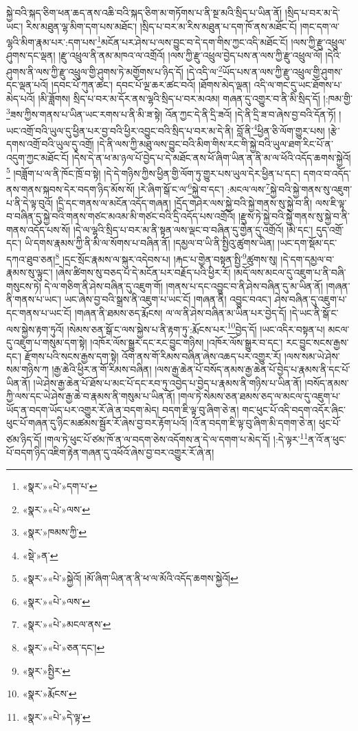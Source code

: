 སྐྱེ་བའི་སྐད་ཅིག་ཕན་ཆད་ནས་འཆི་བའི་སྐད་ཅིག་མ་གཏོགས་པ་ནི་སྔ་མའི་སྲིད་པ་ཡིན་ནོ། །སྲིད་པ་བར་མ་དེ་ཡང་། རིས་མཐུན་ལྷ་མིག་དག་པས་མཐོང་། །སྲིད་པ་བར་མ་རིས་མཐུན་པ་དག་ཁོ་ནས་མཐོང་ངོ། །གང་དག་ལ་ལྷའི་མིག་རྣམ་པར་:དག་པས་\footnote{«སྣར་»«པེ་»དག་པ་}མངོན་པར་ཤེས་པ་ལས་བྱུང་བ་དེ་དག་གིས་ཀྱང་འདི་མཐོང་ངོ། །ལས་ཀྱི་རྫུ་འཕྲུལ་ཤུགས་དང་ལྡན། །རྫུ་འཕྲུལ་ནི་ནམ་མཁའ་ལ་འགྲོའོ། །ལས་ཀྱི་རྫུ་འཕྲུལ་བྱེད་པས་ན་ལས་ཀྱི་རྫུ་འཕྲུལ་ལོ། །དེའི་ཤུགས་ནི་ལས་ཀྱི་རྫུ་འཕྲུལ་གྱི་ཤུགས་ཏེ་མགྱོགས་པ་ཉིད་དོ། །དེ་འདི་ལ་\footnote{«སྣར་»«པེ་»ལས་}ཡོད་པས་ན་ལས་ཀྱི་རྫུ་འཕྲུལ་གྱི་ཤུགས་དང་ལྡན་པའོ། །དབང་པོ་ཀུན་ཚང་། དབང་པོ་ལྔ་ཆར་ཚང་བའོ། །ཐོགས་མེད་ལྡན། འདི་ལ་གང་དུ་ཡང་ཐོགས་པ་མེད་པའོ། །མི་ཟློགས། སྲིད་པ་བར་མ་དོར་ནས་ལྷའི་སྲིད་པ་བར་མའམ། གཞན་དུ་འགྱུར་བ་ནི་མི་སྲིད་དོ། །:ཁམ་གྱི་\footnote{«སྣར་»ཁམས་ཀྱི་}ཟས་ཀྱིས་གནས་པ་ཡིན་ཡང་རགས་པ་ནི་མི་ཟ་སྟེ། འོན་ཀྱང་དེ་ནི་དྲི་ཟའོ། །དེ་ནི་དྲི་ཟ་བ་ཞེས་བྱ་བའི་དོན་ཏོ། །ཡང་འགྲོ་བའི་ཡུལ་དུ་ཕྱིན་པར་བྱ་བའི་ཕྱིར་འབྱུང་བའི་སྲིད་པ་བར་མ་དེ་ནི། བློ་ནི་\footnote{«སྡེ་»ན་}ཕྱིན་ཅི་ལོག་གྱུར་པས། །རྩེ་དགས་འགྲོ་བའི་ཡུལ་དུ་འགྲོ། །དེ་ནི་ལས་ཀྱི་མཐུ་ལས་བྱུང་བའི་མིག་གིས་རང་གི་སྐྱེ་བའི་ཡུལ་ཐག་རིང་པོ་ན་འདུག་ཀྱང་མཐོང་ངོ། །དེས་དེ་ན་ཕ་མ་ཉལ་པོ་བྱེད་པ་དེ་མཐོང་ནས་ཕོ་ཞིག་ཡིན་ན་ནི་མ་ལ་ཕོའི་འདོད་ཆགས་སྐྱེའོ།\footnote{«སྣར་»«པེ་»སྐྱེའོ། །མོ་ཞིག་ཡིན་ན་ནི་ཕ་ལ་མོའི་འདོད་ཆགས་སྐྱེའོ།} །བཟློག་པ་ལ་ནི་ཁོང་ཁྲོ་བ་སྟེ། །དེ་དེ་གཉིས་ཀྱིས་ཕྱིན་གྱི་ལོག་ཏུ་གྱུར་པས་ཡུལ་དེར་ཕྱིན་པ་དང་། དགའ་བ་འདོད་ནས་གནས་སྐབས་དེར་བདག་ཉིད་མོས་སོ། །རེ་ཞིག་སྒོ་ང་ལ་\footnote{«སྣར་»«པེ་»ལས་}སྐྱེ་བ་དང་། :མངལ་ལས་\footnote{«སྣར་»«པེ་»མངལ་ནས་}སྐྱེ་བའི་སྐྱེ་གནས་སུ་འཇུག་པ་ནི་དེ་ལྟ་བུའོ། །དྲི་དང་གནས་ལ་མངོན་འདོད་གཞན། །དྲོད་གཤེར་ལས་སྐྱེ་བའི་སྐྱེ་གནས་སུ་སྐྱེ་བ་ནི། ལས་ཇི་ལྟ་བ་བཞིན་དུ་སྐྱེ་བའི་གནས་གཙང་མའམ་མི་གཙང་བའི་དྲི་འདོད་པས་འགྲོའོ། །རྫུས་ཏེ་སྐྱེ་བའི་སྐྱེ་གནས་སུ་སྐྱེ་བ་ནི་གནས་འདོད་པས་སོ། །དེ་ལ་ལྷའི་སྲིད་པ་བར་མ་ནི་སྟན་ལས་ལྡང་བ་བཞིན་དུ་གྱེན་དུ་འགྲོའོ། །མི་དང་། དུད་འགྲོ་དང་། ཡི་དགས་རྣམས་ཀྱི་ནི་མི་ལ་སོགས་པ་བཞིན་ནོ། །དམྱལ་བ་ཡི་ནི་སྤྱིའུ་ཚུགས་ཡིན། །ཡང་དག་སྡོམ་དང་དཀའ་ཐུབ་ཅན།\footnote{«སྣར་»«པེ་»ཅན་དང་།} །དྲང་སྲོང་རྣམས་ལ་སྐུར་འདེབས་པ། །རྐང་པ་གྱེན་བསྟན་སྤྱི་\footnote{«སྣར་»སྤྱིར་}ཚུགས་སུ། །དེ་དག་དམྱལ་བ་རྣམས་སུ་ལྟུང་། །ཞེས་ཚིགས་སུ་བཅད་པ་དེ་མངོན་པར་བརྗོད་པའི་ཕྱིར་རོ། །མདོ་ལས་མངལ་དུ་འཇུག་པ་ནི་བཞི་གསུངས་ཏེ། དེ་ལ་གཅིག་ནི་ཤེས་བཞིན་དུ་འཇུག་གོ། །གནས་པ་དང་འབྱུང་བ་ནི་ཤེས་བཞིན་དུ་མ་ཡིན་ནོ། །གཞན་ནི་གནས་པ་ཡང་། ཡང་ཞེས་བྱ་བའི་སྒྲས་ནི་འཇུག་པ་ཡང་ངོ། །གཞན་ནི། འབྱུང་བའང་། ཤེས་བཞིན་དུ་འཇུག་པ་དང་གནས་པ་ཡང་ངོ། །གཞན་ནི་ཐམས་ཅད་རྨོངས། ལ་ལ་ནི་ཤེས་བཞིན་མ་ཡིན་པར་བྱེད་དོ། །དེ་ཡང་ནི་སྒོ་ང་ལས་སྐྱེས་རྟག་ཏུའོ། །སེམས་ཅན་སྒོ་ང་ལས་སྐྱེས་པ་ནི་རྟག་ཏུ་:རྨོངས་པར་\footnote{«སྣར་»རྨོངས་}བྱེད་དོ། །ཡང་འདིར་བསྟན་པ། མངལ་དུ་འཇུག་པ་གསུམ་དག་སྟེ། །འཁོར་ལོས་སྒྱུར་དང་རང་བྱུང་གཉིས། །འཁོར་ལོས་སྒྱུར་བ་དང་། རང་བྱུང་སངས་རྒྱས་དང་། རྫོགས་པའི་སངས་རྒྱས་དག་སྟེ། འོག་ནས་གོ་རིམས་བཞིན་ཞེས་འཆད་པར་འགྱུར་རོ། །ལས་སམ་ཡེ་ཤེས་སམ་གཉིས་ཀ །རྒྱ་ཆེའི་ཕྱིར་ན་གོ་རིམས་བཞིན། །ལས་རྒྱ་ཆེན་པོ་བསོད་ནམས་རྒྱ་ཆེན་པོ་བྱེད་པ་རྣམས་ནི་དང་པོ་ཡིན་ནོ། །ཡེ་ཤེས་རྒྱ་ཆེན་པོ་ཐོས་པ་མང་པོ་དང་རབ་ཏུ་འབྱེད་པ་བྱེད་པ་རྣམས་ནི་གཉིས་པ་ཡིན་ནོ། །བསོད་ནམས་ཀྱི་ལས་དང་ཡེ་ཤེས་རྒྱ་ཆེ་བ་རྣམས་ནི་གསུམ་པ་ཡིན་ནོ། །གལ་ཏེ་སེམས་ཅན་ཐམས་ཅད་ལ་མངལ་དུ་འཇུག་པ་ཡོད་ན་བདག་ཡོད་པར་འགྱུར་རོ་ཞེ་ན་བདག་མེད། བདག་ཇི་ལྟ་བུ་ཞིག་ཅེ་ན། གང་ཕུང་པོ་འདི་བདག་འདོར་ཞིང་ཕུང་པོ་གཞན་དུ་ཉིང་མཚམས་སྦྱོར་རོ་ཞེས་བྱ་བར་རྟོག་པའོ། །འོ་ན་བདག་ཇི་ལྟ་བུ་ཞིག་མི་དགག་ཅེ་ན། ཕུང་པོ་ཙམ་ཉིད་དོ། །གལ་ཏེ་ཕུང་པོ་ཙམ་ཁོ་ན་ལ་བདག་ཅེས་འདོགས་ན་དེ་ལ་དགག་པ་མེད་དོ། །:དེ་ལྟར་\footnote{«སྣར་»«པེ་»དེ་ལྟ་}ན་འོ་ན་ཕུང་པོ་བདག་ཉིད་འཇིག་རྟེན་གཞན་དུ་འཕོའོ་ཞེས་བྱ་བར་འགྱུར་རོ་ཞེ་ན། 
